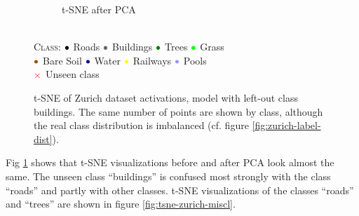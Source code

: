 \documentclass[10pt]{article}
\newcommand{\legendBullet}{
    \textsc{Class}: 
    ${\color{black}\bullet}$ Roads
    ${\color{buildings}\bullet}$ Buildings
    ${\color{trees}\bullet}$ Trees
    ${\color{grass}\bullet}$ Grass\\
    ${\color{baresoil}\bullet}$ Bare Soil
    ${\color{water}\bullet}$ Water
    ${\color{railways}\bullet}$ Railways
    ${\color{swimmingpools}\bullet}$ Pools\\
    ${\color{unseen}\times}$ Unseen class
    }
\begin{document}
\begin{figure}[H]
\begin{subfigure}{.5\textwidth}
        \caption{\gls{t-SNE} after \gls{PCA}}
    \end{subfigure}
    \\[.2cm]
    \legendBullet
    \caption{\gls{t-SNE} of Zurich dataset activations, model with left-out class buildings. The same number of points are shown by class, although the real class distribution is imbalanced (cf. figure \ref{fig:zurich-label-dist}).}
    \label{fig:tsne-zurich}
\end{figure}

Fig \ref{fig:tsne-zurich} shows that \gls{t-SNE} visualizations before and after \gls{PCA} look almost the same. The unseen class ``buildings'' is confused most strongly with the class ``roads'' and partly with other classes. \gls{t-SNE} visualizations of the classes ``roads'' and ``trees''  are shown in figure \ref{fig:tsne-zurich-miscl}.
\end{document}
